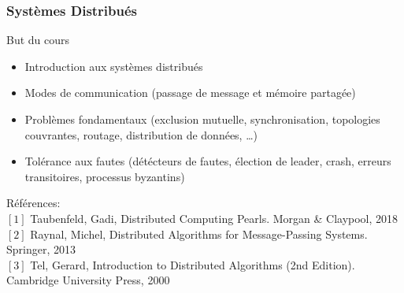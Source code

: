 \begin{frame}
  \frametitle{Syst\`emes Distribu\'es}
  
  \begin{beamerboxesrounded}{But du cours}
    \begin{itemize}
    \item Introduction aux syst\`emes distribu\'es
    \item Modes de communication (passage de message et m\'emoire partag\'ee)
    \item Probl\`emes fondamentaux (exclusion mutuelle, synchronisation, topologies couvrantes, routage, distribution de donn\'ees, \ldots)
    \item Tol\'erance aux fautes (d\'et\'ecteurs de fautes, \'election de leader, crash, erreurs transitoires, processus byzantins)
    \end{itemize}
  \end{beamerboxesrounded}
  
  \bigskip
  
  \small R\'ef\'erences:\\
  $[1]$ Taubenfeld, Gadi, Distributed Computing Pearls. Morgan \& Claypool, 2018\\
  $[2]$ Raynal, Michel, Distributed Algorithms for Message-Passing Systems. Springer, 2013\\
  $[3]$ Tel, Gerard, Introduction to Distributed Algorithms (2nd Edition). Cambridge University Press, 2000
  
\end{frame}

